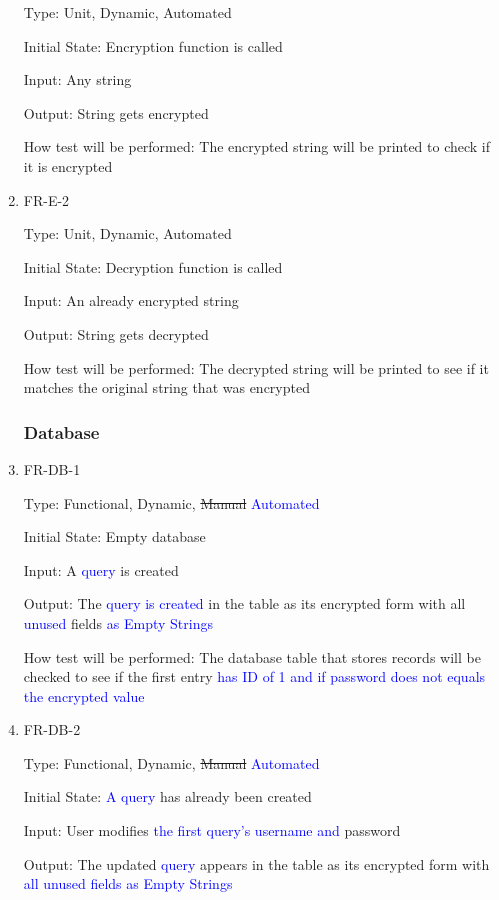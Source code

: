 \documentclass[12pt, titlepage]{article}
\begin{document}
\begin{enumerate}
Type: Unit, Dynamic, Automated

Initial State: Encryption function is called

Input: Any string

Output: String gets encrypted

How test will be performed: The encrypted string will be printed to check if it is encrypted

\item{FR-E-2\\}

Type: Unit, Dynamic, Automated

Initial State: Decryption function is called

Input: An already encrypted string

Output: String gets decrypted

How test will be performed: The decrypted string will be printed to see if it matches the original string that was encrypted

\subsubsection{Database}

\item{FR-DB-1\\}

Type: Functional, Dynamic, \sout{Manual} \textcolor{blue}{Automated}

Initial State: Empty database

Input: A \textcolor{blue}{query} is created

Output: The \textcolor{blue}{query is created} in the table as its encrypted form with all \textcolor{blue}{unused} fields \textcolor{blue}{as Empty Strings}

How test will be performed: The database table that stores records will be checked to see if the first entry \textcolor{blue}{has ID of 1 and if password does not equals the encrypted value}

\item{FR-DB-2\\}

Type: Functional, Dynamic, \sout{Manual} \textcolor{blue}{Automated}

Initial State: \textcolor{blue}{A query} has already been created

Input: User modifies \textcolor{blue}{the first query's username and} password

Output: The updated \textcolor{blue}{query} appears in the table as its encrypted form with \textcolor{blue}{all unused fields as Empty Strings}


\end{enumerate}
\end{document}
